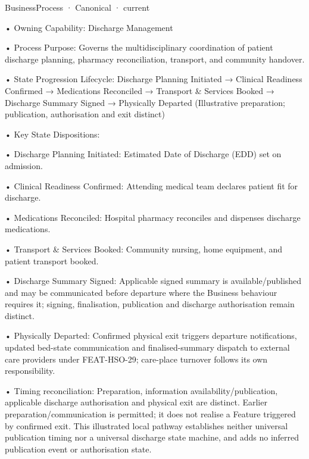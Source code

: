 \label{element:7165955d9c454175a04b9ad00293f011}
{\small BusinessProcess · Canonical · current}\par

•
Owning Capability: Discharge Management



•
Process Purpose: Governs the multidisciplinary coordination of patient discharge planning, pharmacy reconciliation, transport, and community handover.



•
State Progression Lifecycle: Discharge Planning Initiated → Clinical Readiness Confirmed → Medications Reconciled → Transport \& Services Booked → Discharge Summary Signed → Physically Departed   (Illustrative preparation; publication, authorisation and exit distinct)



•
Key State Dispositions:



•
Discharge Planning Initiated: Estimated Date of Discharge (EDD) set on admission.



•
Clinical Readiness Confirmed: Attending medical team declares patient fit for discharge.



•
Medications Reconciled: Hospital pharmacy reconciles and dispenses discharge medications.



•
Transport \& Services Booked: Community nursing, home equipment, and patient transport booked.



•
Discharge Summary Signed: Applicable signed summary is available/published and may be communicated before departure where the Business behaviour requires it; signing, finalisation, publication and discharge authorisation remain distinct.



•
Physically Departed: Confirmed physical exit triggers departure notifications, updated bed-state communication and finalised-summary dispatch to external care providers under FEAT-HSO-29; care-place turnover follows its own responsibility.



•
Timing reconciliation: Preparation, information availability/publication, applicable discharge authorisation and physical exit are distinct. Earlier preparation/communication is permitted; it does not realise a Feature triggered by confirmed exit. This illustrated local pathway establishes neither universal publication timing nor a universal discharge state machine, and adds no inferred publication event or authorisation state.



